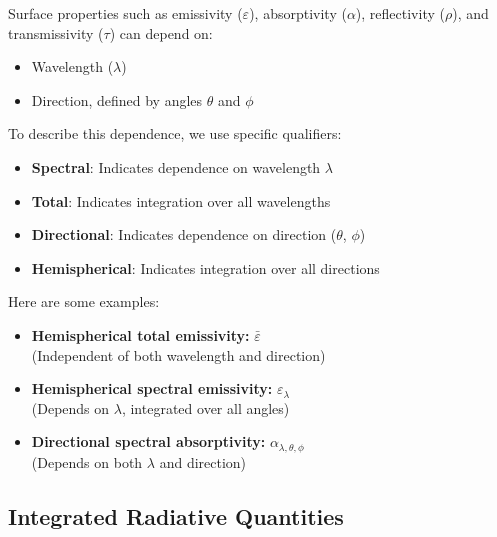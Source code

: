 Surface properties such as emissivity ($\varepsilon$), absorptivity ($\alpha$), reflectivity ($\rho$), and transmissivity ($\tau$) can depend on:

\begin{itemize}
    \item Wavelength ($\lambda$)
    \item Direction, defined by angles $\theta$ and $\phi$
\end{itemize}

To describe this dependence, we use specific qualifiers:

\begin{itemize}
    \item \textbf{Spectral}: Indicates dependence on wavelength $\lambda$
    \item \textbf{Total}: Indicates integration over all wavelengths
    \item \textbf{Directional}: Indicates dependence on direction ($\theta$, $\phi$)
    \item \textbf{Hemispherical}: Indicates integration over all directions
\end{itemize}

\noindent
Here are some examples:

\begin{itemize}
    \item \textbf{Hemispherical total emissivity:} $\bar{\varepsilon}$ \\
    (Independent of both wavelength and direction)

    \item \textbf{Hemispherical spectral emissivity:} $\varepsilon_\lambda$ \\
    (Depends on $\lambda$, integrated over all angles)

    \item \textbf{Directional spectral absorptivity:} $\alpha_{\lambda, \theta, \phi}$ \\
    (Depends on both $\lambda$ and direction)
\end{itemize}



\subsection*{Integrated Radiative Quantities}

